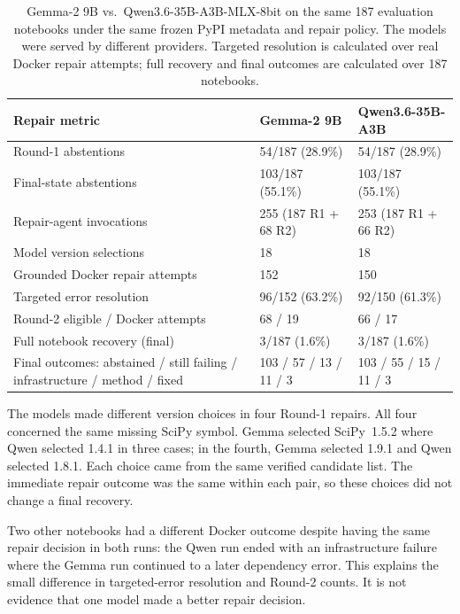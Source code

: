 \begin{table}[htbp]
  \centering
  \small
  \begin{tabular}{|p{5.3cm}|p{3.3cm}|p{3.3cm}|}
    \hline
    \textbf{Repair metric} & \textbf{Gemma-2 9B} & \textbf{Qwen3.6-35B-A3B} \\
    \hline
    Round-1 abstentions & 54/187 (28.9\%) & 54/187 (28.9\%) \\
    \hline
    Final-state abstentions & 103/187 (55.1\%) & 103/187 (55.1\%) \\
    \hline
    Repair-agent invocations & 255 (187 R1 + 68 R2) & 253 (187 R1 + 66 R2) \\
    \hline
    Model version selections & 18 & 18 \\
    \hline
    Grounded Docker repair attempts & 152 & 150 \\
    \hline
    Targeted error resolution & 96/152 (63.2\%) & 92/150 (61.3\%) \\
    \hline
    Round-2 eligible / Docker attempts & 68 / 19 & 66 / 17 \\
    \hline
    Full notebook recovery (final) & 3/187 (1.6\%) & 3/187 (1.6\%) \\
    \hline
    Final outcomes: abstained / still failing / infrastructure / method / fixed &
      103 / 57 / 13 / 11 / 3 & 103 / 55 / 15 / 11 / 3 \\
    \hline
  \end{tabular}
  \caption{Gemma-2 9B vs.\ Qwen3.6-35B-A3B-MLX-8bit on the same 187
  evaluation notebooks under the same frozen PyPI metadata and repair policy.
  The models were served by different providers. Targeted resolution is
  calculated over real Docker repair attempts; full recovery and final outcomes
  are calculated over 187 notebooks.}
  \label{tab:v-model-sensitivity}
\end{table}

The models made different version choices in four Round-1 repairs. All four
concerned the same missing SciPy symbol. Gemma selected SciPy~1.5.2 where
Qwen selected 1.4.1 in three cases; in the fourth, Gemma selected 1.9.1 and
Qwen selected 1.8.1. Each choice came from the same verified candidate list.
The immediate repair outcome was the same within each pair, so these choices
did not change a final recovery.

Two other notebooks had a different Docker outcome despite having the same
repair decision in both runs: the Qwen run ended with an infrastructure failure
where the Gemma run continued to a later dependency error. This explains the
small difference in targeted-error resolution and Round-2 counts. It is not
evidence that one model made a better repair decision.

